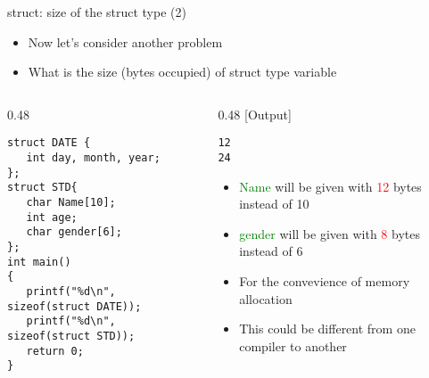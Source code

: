 \begin{frame}[fragile]{struct: size of the struct type (2)}
\begin{itemize}
	\item {Now let's consider another problem}
	\item {What is the size (bytes occupied) of struct type variable}
\end{itemize}
\begin{columns}
\begin{column}{0.48\linewidth}
\begin{lstlisting}
struct DATE {
   int day, month, year;
};
struct STD{
   char Name[10];
   int age;
   char gender[6];
};
int main()
{  
   printf("%d\n", sizeof(struct DATE));
   printf("%d\n", sizeof(struct STD));
   return 0;
}
\end{lstlisting}
\end{column}
\begin{column}{0.48\linewidth}
[Output]
\begin{lstlisting}
12
24
\end{lstlisting}
\begin{itemize}
	\item {\textcolor{green}{Name} will be given with \textcolor{red}{12} bytes instead of 10}
	\item {\textcolor{green}{gender} will be given with \textcolor{red}{8} bytes instead of 6}
	\item {For the convevience of memory allocation}
	\item {This could be different from one compiler to another}
\end{itemize}
\end{column}
\end{columns}
\end{frame}


